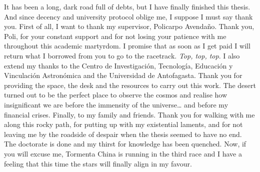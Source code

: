 It has been a long, dark road full of debts, but I have finally finished this thesis. And since decency and university protocol oblige me, I suppose I must say thank you.
First of all, I want to thank my supervisor, Policarpo Avendaño. Thank you, Poli, for your constant support and for not losing your patience with me throughout this academic martyrdom. I promise that as soon as I get paid I will return what I borrowed from you to go to the racetrack. \textit{Top, top, top}.
I also extend my thanks to the Centro de Investigación, Tecnología, Educación y Vinculación Astronómica and the Universidad de Antofagasta. Thank you for providing the space, the desk and the resources to carry out this work. The desert turned out to be the perfect place to observe the cosmos and realise how insignificant we are before the immensity of the universe\ldots{} and before my financial crises.
Finally, to my family and friends. Thank you for walking with me along this rocky path, for putting up with my existential laments, and for not leaving me by the roadside of despair when the thesis seemed to have no end.
The doctorate is done and my thirst for knowledge has been quenched. Now, if you will excuse me, Tormenta China is running in the third race and I have a feeling that this time the stars will finally align in my favour.
